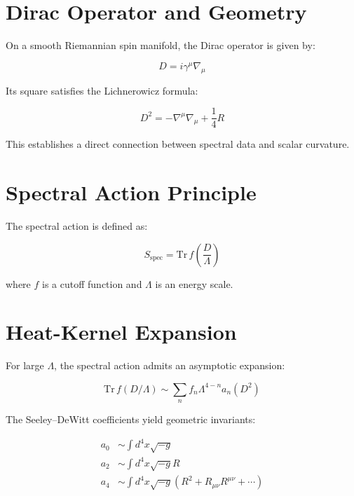 \documentclass[11pt]{article}
\begin{document}
\section{Dirac Operator and Geometry}

On a smooth Riemannian spin manifold, the Dirac operator is given by:

\begin{equation}
D = i \gamma^\mu \nabla_\mu
\end{equation}

Its square satisfies the Lichnerowicz formula:

\begin{equation}
D^2 = -\nabla^\mu \nabla_\mu + \frac{1}{4} R
\end{equation}

This establishes a direct connection between spectral data and scalar curvature.

\section{Spectral Action Principle}

The spectral action is defined as:

\begin{equation}
S_{\mathrm{spec}} = \mathrm{Tr}\, f\left(\frac{D}{\Lambda}\right)
\end{equation}

where $f$ is a cutoff function and $\Lambda$ is an energy scale.

\section{Heat-Kernel Expansion}

For large $\Lambda$, the spectral action admits an asymptotic expansion:

\begin{equation}
\mathrm{Tr}\, f(D/\Lambda)
\sim
\sum_n f_n \Lambda^{4-n} a_n(D^2)
\end{equation}

The Seeley–DeWitt coefficients yield geometric invariants:

\begin{align}
a_0 &\sim \int d^4x \sqrt{-g} \\
a_2 &\sim \int d^4x \sqrt{-g} R \\
a_4 &\sim \int d^4x \sqrt{-g} \left(R^2 + R_{\mu\nu}R^{\mu\nu} + \cdots \right)
\end{align}
\end{document}
